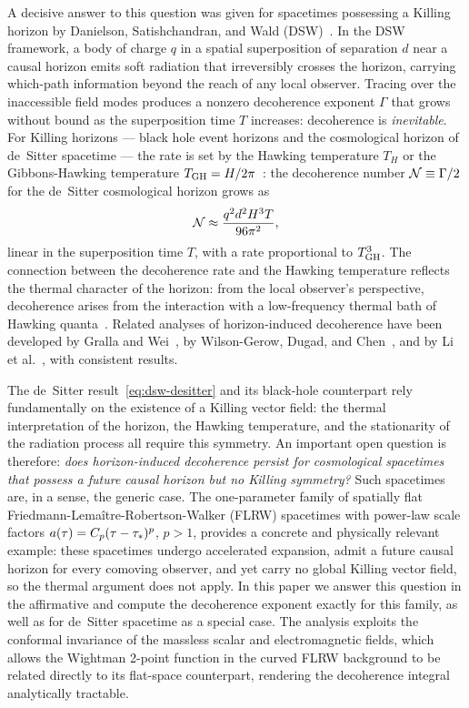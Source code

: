 A decisive answer to this question was given for spacetimes possessing a Killing
horizon by Danielson, Satishchandran, and Wald
(DSW)~\cite{Danielson:2022sga,Danielson:2022tdw,Danielson:2024yge}.  In the DSW
framework, a body of charge $q$ in a spatial superposition of separation $d$
near a causal horizon emits soft radiation that irreversibly crosses the horizon,
carrying which-path information beyond the reach of any local observer.  Tracing
over the inaccessible field modes produces a nonzero decoherence exponent $\Gamma$
that grows without bound as the superposition time $T$ increases: decoherence is
\emph{inevitable}.  For Killing horizons — black hole event horizons and the
cosmological horizon of de~Sitter spacetime — the rate is set by the Hawking
temperature $T_H$ or the Gibbons-Hawking temperature
$T_{\rm GH} = H/2\pi$~\cite{Gibbons:1977mu}: the decoherence number
$\mathcal{N} \equiv \Gamma/2$ for the de~Sitter cosmological horizon grows
as~\cite{Danielson:2022tdw}
\begin{equation}
  \mathcal{N} \approx \frac{q^{2}d^{2}H^{3}T}{96\pi^{2}} ,
  \label{eq:dsw-desitter}
\end{equation}
linear in the superposition time $T$, with a rate proportional to $T_{\rm GH}^{3}$.
The connection between the decoherence rate and the Hawking temperature reflects
the thermal character of the horizon: from the local observer's perspective,
decoherence arises from the interaction with a low-frequency thermal bath of
Hawking quanta~\cite{Danielson:2024yge}.  Related analyses of horizon-induced
decoherence have been developed by Gralla and Wei~\cite{Gralla:2023oya}, by
Wilson-Gerow, Dugad, and Chen~\cite{WilsonGerow:2024}, and by Li et
al.~\cite{Li:2024}, with consistent results.

The de~Sitter result~\eqref{eq:dsw-desitter} and its black-hole counterpart
rely fundamentally on the existence of a Killing vector field: the thermal
interpretation of the horizon, the Hawking temperature, and the stationarity of
the radiation process all require this symmetry.  An important open question is
therefore: \emph{does horizon-induced decoherence persist for cosmological
spacetimes that possess a future causal horizon but no Killing symmetry?}
Such spacetimes are, in a sense, the generic case.  The one-parameter family of
spatially flat Friedmann-Lema\^{i}tre-Robertson-Walker (FLRW) spacetimes with
power-law scale factors $a(\tau) = C_{p}(\tau - \tau_{*})^{p}$,
$p > 1$, provides a concrete and physically relevant example: these spacetimes
undergo accelerated expansion, admit a future causal horizon for every
comoving observer, and yet carry no global Killing vector field, so the thermal
argument does not apply.  In this paper we answer this question in the
affirmative and compute the decoherence exponent exactly for this family, as
well as for de~Sitter spacetime as a special case.  The analysis exploits the
conformal invariance of the massless scalar and electromagnetic fields, which
allows the Wightman 2-point function in the curved FLRW background to be related
directly to its flat-space counterpart, rendering the decoherence integral
analytically tractable.

